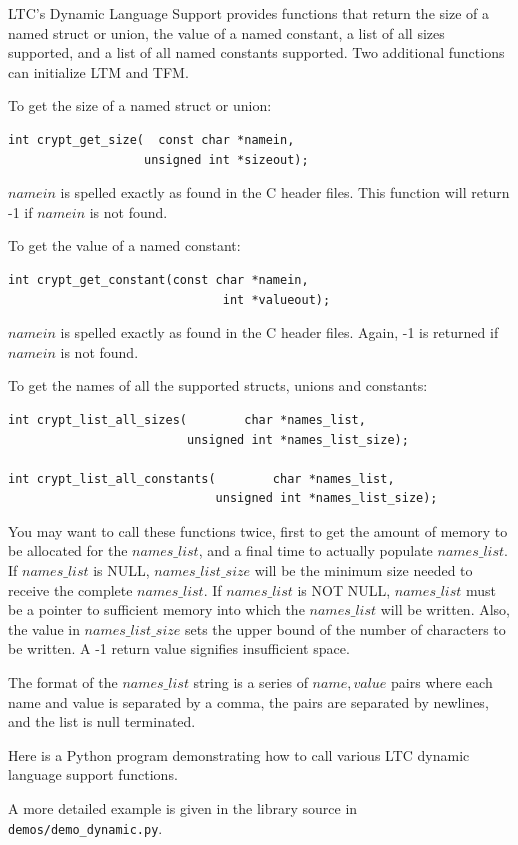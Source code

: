 \documentclass[synpaper]{book}
\begin{document}
LTC's Dynamic Language Support provides functions that return the size of
a named struct or union, the value of a named constant, a list of all sizes
supported, and a list of all named constants supported.  Two additional
functions can initialize LTM and TFM.

To get the size of a named struct or union:
\begin{verbatim}
int crypt_get_size(  const char *namein,
                   unsigned int *sizeout);
\end{verbatim}
$namein$ is spelled exactly as found in the C header files.  This function will
return -1 if $namein$ is not found.

To get the value of a named constant:
\begin{verbatim}
int crypt_get_constant(const char *namein,
                              int *valueout);
\end{verbatim}
$namein$ is spelled exactly as found in the C header files.  Again, -1 is
returned if $namein$ is not found.

To get the names of all the supported structs, unions and constants:
\begin{verbatim}
int crypt_list_all_sizes(        char *names_list,
                         unsigned int *names_list_size);

int crypt_list_all_constants(        char *names_list,
                             unsigned int *names_list_size);
\end{verbatim}
You may want to call these functions twice, first to get the amount
of memory to be allocated for the $names\_list$, and a final time to
actually populate $names\_list$.  If $names\_list$ is NULL,
$names\_list\_size$ will be the minimum size needed to receive the
complete $names\_list$.  If $names\_list$ is NOT NULL, $names\_list$ must
be a pointer to sufficient memory into which the $names\_list$ will be
written.  Also, the value in $names\_list\_size$ sets the upper bound of
the number of characters to be written.  A -1 return value signifies
insufficient space.

The format of the $names\_list$ string is a series of $name,value$ pairs
where each name and value is separated by a comma, the pairs are separated
by newlines, and the list is null terminated.

Here is a Python program demonstrating how to call various LTC dynamic
language support functions.

A more detailed example is given in the library source in \texttt{demos/demo\_dynamic.py}.
\end{document}
